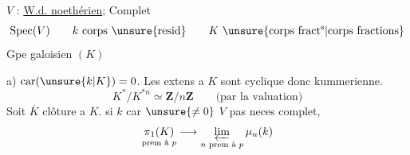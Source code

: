 $V$ : \uline{W.d. noethérien}; Complet
\[
\operatorname{Spec}(V)\qquad k\ \text{corps \unsure{resid}}\qquad K\ \text{\unsure{corps fract\textsuperscript{s}|corps fractions}}
\]
Gpe galoisien $(K)$

a) $\operatorname{car}(\unsure{k|K})=0$\qquad {}.
Les extens a $K$ sont  cyclique donc kummerienne.
\[
K^*/K^{*n}\simeq\mathbf Z/n\mathbf Z\qquad\text{(par la valuation)}
\]
Soit $\overline K$ clôture a $K$.
si $k$ car $\unsure{\ne0}$ $V$ pas neces complet,
\[
\underset{\text{prem à }p}{\pi_1(K)}\longrightarrow\varprojlim_{n\text{ prem à }p}\mu_n(k)
\]
